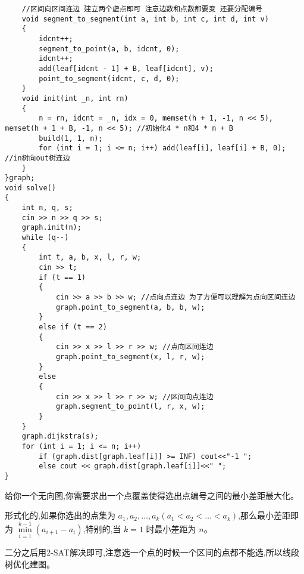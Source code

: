 \documentclass[a4paper,fontset=none]{ctexart}
\begin{document}
\begin{verbatim}
    //区间向区间连边 建立两个虚点即可 注意边数和点数都要变 还要分配编号
    void segment_to_segment(int a, int b, int c, int d, int v)
    {
        idcnt++;
        segment_to_point(a, b, idcnt, 0);
        idcnt++;
        add(leaf[idcnt - 1] + B, leaf[idcnt], v);
        point_to_segment(idcnt, c, d, 0);
    }
    void init(int _n, int rn)
    {
        n = rn, idcnt = _n, idx = 0, memset(h + 1, -1, n << 5), memset(h + 1 + B, -1, n << 5); //初始化4 * n和4 * n + B
        build(1, 1, n);
        for (int i = 1; i <= n; i++) add(leaf[i], leaf[i] + B, 0); //in树向out树连边
    }
}graph;
void solve()
{
    int n, q, s;
    cin >> n >> q >> s;
    graph.init(n);
    while (q--)
    {
        int t, a, b, x, l, r, w;
        cin >> t;
        if (t == 1)
        {
            cin >> a >> b >> w; //点向点连边 为了方便可以理解为点向区间连边
            graph.point_to_segment(a, b, b, w);
        }
        else if (t == 2)
        {
            cin >> x >> l >> r >> w; //点向区间连边
            graph.point_to_segment(x, l, r, w);
        }
        else
        {
            cin >> x >> l >> r >> w; //区间向点连边
            graph.segment_to_point(l, r, x, w);
        }
    }
    graph.dijkstra(s);
    for (int i = 1; i <= n; i++)
        if (graph.dist[graph.leaf[i]] >= INF) cout<<"-1 ";
        else cout << graph.dist[graph.leaf[i]]<<" ";
}
\end{verbatim}

给你一个无向图,你需要求出一个点覆盖使得选出点编号之间的最小差距最大化。

形式化的,如果你选出的点集为 $a_1,a_2,\dots,a_k (a_1<a_2<\dots<a_k)$,那么最小差距即为 $\min \limits_{i=1}^{k-1}{(a_{i+1}-a_i)}$,特别的,当 $k=1$ 时最小差距为 $n$。

二分之后用2-SAT解决即可,注意选一个点的时候一个区间的点都不能选,所以线段树优化建图。
\end{document}

